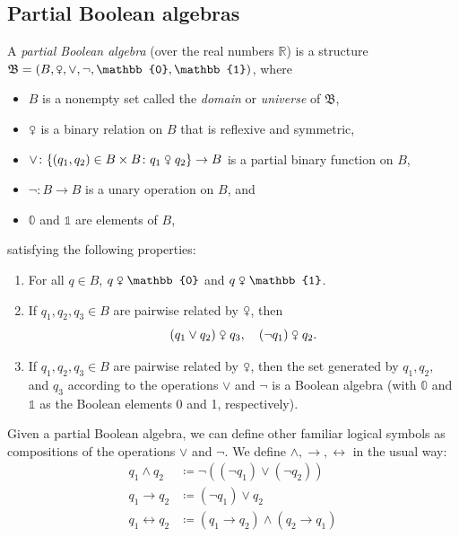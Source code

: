 \documentclass{scrartcl}
\newcommand{\FB}{\mathfrak{B}}
\newcommand{\BR}{\mathbb{R}}
\newcommand{\com}{\mathrel{\venus}}
\begin{document}
\subsection{Partial Boolean algebras}
\begin{definition}\label{D:partial boolean algebra}
A \emph{partial Boolean algebra} (over the real numbers $\BR$) is a structure $\FB = (B, \com, \lor, \neg,\mathbb{0}, \mathbb{1})$, where
\begin{itemize}

\item
$B$ is a nonempty set called the \emph{domain} or \emph{universe} of $\FB$,

\item
$\venus$ is a binary relation on $B$ that is reflexive and symmetric,

\item
$\lor \colon \{ (q_1, q_2 ) \in B\times B \colon q_1 \com q_2 \} \to B  $ is a partial binary function on $B$,

\item
$\neg \colon B \to B $ is a unary operation on $B$, and

\item
$\mathbb{0}$ and $\mathbb{1}$ are elements of $B$,
\end{itemize}
satisfying the following properties:

\begin{enumerate}[(1)]

\item
For all $q\in B$, $q\com \mathbb{0}$ and $q \com \mathbb{1}$.

\item\label{P:pba com preserved}
If $q_1,q_2,q_3\in B$ are pairwise related by $\venus$, then
\[
(q_1 \lor q_2) \com q_3, \quad (\neg q_1) \com q_2.
\]

\item\label{P:pba boolean algebra}
If $q_1,q_2,q_3\in B$ are pairwise related by $\venus$, then the set generated by $q_1,q_2,$ and $q_3$ according to the operations $\lor$ and $\neg$ is a Boolean algebra (with $\mathbb{0}$ and $\mathbb{1}$ as the Boolean elements 0 and 1, respectively).

\end{enumerate}

\end{definition}

Given a partial Boolean algebra, we can define other familiar logical symbols as compositions of the operations $\lor$ and $\neg$. We define $\land,\to,\leftrightarrow$ in the usual way:
\begin{align*}
q_1\land q_2 &\coloneq\neg((\neg q_1)\lor(\neg q_2))\\
q_1\to q_2 &\coloneq(\neg q_1)\lor q_2\\
q_1\leftrightarrow q_2 &\coloneq(q_1\to q_2)\land(q_2\to q_1)
\end{align*}
\end{document}
